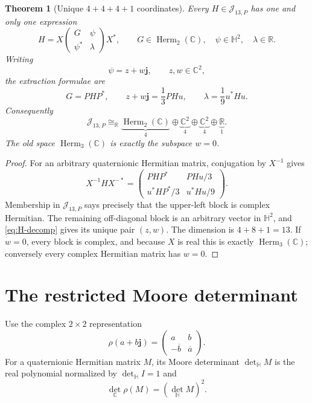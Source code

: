 \documentclass[11pt]{article}
\newtheorem{theorem}{Theorem}[section]
\theoremstyle{definition}
\theoremstyle{remark}
\newcommand{\C}{\mathbb C}
\newcommand{\Hh}{\mathbb H}
\newcommand{\R}{\mathbb R}
\newcommand{\Herm}{\operatorname{Herm}}
\newcommand{\cJ}{\mathcal J}
\newcommand{\bj}{\mathbf j}
\begin{document}
\begin{theorem}[Unique $4+4+4+1$ coordinates]\label{thm:coordinates}
Every $H\in\cJ_{13,P}$ has one and only one expression
\begin{equation}\label{eq:marked-block}
 H=X
 \begin{pmatrix}
  G&\psi\\ \psi^*&\lambda
 \end{pmatrix}X^*,
 \qquad
 G\in\Herm_2(\C),\quad
 \psi\in\Hh^2,\quad
 \lambda\in\R.
\end{equation}
Writing
\begin{equation}\label{eq:psi-zw}
 \psi=z+w\bj,
 \qquad z,w\in\C^2,
\end{equation}
the extraction formulae are
\begin{equation}\label{eq:extraction}
 G=PHP^*,
 \qquad
 z+w\bj=\frac13PHu,
 \qquad
 \lambda=\frac19u^*Hu.
\end{equation}
Consequently
\begin{equation}\label{eq:4441}
 \boxed{
 \cJ_{13,P}
 \cong_{\R}
 \underbrace{\Herm_2(\C)}_{4}
 \oplus
 \underbrace{\C^2}_{4}
 \oplus
 \underbrace{\C^2}_{4}
 \oplus
 \underbrace{\R}_{1}.}
\end{equation}
The old space $\Herm_3(\C)$ is exactly the subspace $w=0$.
\end{theorem}

\begin{proof}
For an arbitrary quaternionic Hermitian matrix, conjugation by $X^{-1}$ gives
\[
 X^{-1}HX^{-*}
 =\begin{pmatrix}
 PHP^*&PHu/3\\u^*HP^*/3&u^*Hu/9
 \end{pmatrix}.
\]
Membership in $\cJ_{13,P}$ says precisely that the upper-left block is complex Hermitian.  The remaining off-diagonal block is an arbitrary vector in $\Hh^2$, and \eqref{eq:H-decomp} gives its unique pair $(z,w)$.  The dimension is $4+8+1=13$.  If $w=0$, every block is complex, and because $X$ is real this is exactly $\Herm_3(\C)$; conversely every complex Hermitian matrix has $w=0$.
\end{proof}

\section{The restricted Moore determinant}

Use the complex $2\times2$ representation
\begin{equation}\label{eq:rhoH}
 \rho(a+b\bj)=
 \begin{pmatrix}a&b\\-\overline b&\overline a\end{pmatrix}.
\end{equation}
For a quaternionic Hermitian matrix $M$, its Moore determinant $\det_{\Hh}M$ is the real polynomial normalized by $\det_{\Hh}I=1$ and
\begin{equation}\label{eq:Moore-square}
 \det_{\C}\rho(M)=(\det_{\Hh}M)^2.
\end{equation}
\end{document}
